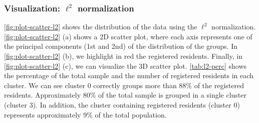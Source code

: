 \begin{table}[]
\centering
{}
\caption{Mean of variables for each cluster performed using min-max normalization.}
\label{tab:means-minmax}
\end{table}

\subsubsection*{Visualization: $\ell^2$ normalization}

\cref{fig:plot-scatter-l2} shows the distribution of the data using the $\ell^2$ normalization. \cref{fig:plot-scatter-l2} (a) shows a 2D scatter plot, where each axis represents one of the principal components (1st and 2nd) of the distribution of the groups. In \cref{fig:plot-scatter-l2} (b), we highlight in red the registered residents. Finally, in \cref{fig:plot-scatter-l2} (c), we can visualize the 3D scatter plot. \cref{tab:l2-perc} shows the percentage of the total sample and the number of registered residents in each cluster. We can see cluster 0 correctly groups more than 88\% of the registered residents. Approximately 80\% of the total sample is grouped in a single cluster (cluster 3). In addition, the cluster containing registered residents (cluster 0) represents approximately 9\% of the total population.

